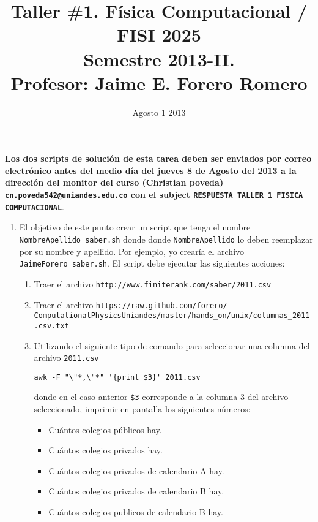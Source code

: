 \documentclass{article}
\title{Taller \#1. F\'isica Computacional / FISI 2025 \\Semestre 2013-II. \\ Profesor: Jaime E. Forero Romero}
\date{Agosto 1 2013}
\begin{document}
\maketitle

{\bf Los dos scripts de soluci\'on de esta tarea deben ser enviados por correo electr\'onico antes del medio d\'ia del jueves 8 de Agosto del 2013 a la direcci\'on del monitor del curso (Christian poveda) {\texttt{cn.poveda542@uniandes.edu.co}} con el subject \verb"RESPUESTA TALLER 1 FISICA COMPUTACIONAL"}.

\begin{enumerate}

\item
El objetivo de este punto crear un script que tenga el nombre \verb"NombreApellido_saber.sh" donde donde \verb"NombreApellido" lo deben reemplazar por su nombre y apellido. Por ejemplo, yo crear\'ia el archivo \verb"JaimeForero_saber.sh". El script debe ejecutar las siguientes acciones:

\begin{enumerate}
\item 
Traer el archivo  \verb"http://www.finiterank.com/saber/2011.csv"
\item
Traer el archivo \verb"https://raw.github.com/forero/"\newline
\verb"ComputationalPhysicsUniandes/master/hands_on/unix/columnas_2011.csv.txt"
\item

  Utilizando el siguiente tipo de comando para seleccionar una columna del archivo \verb"2011.csv"
\begin{verbatim}
awk -F "\"*,\"*" '{print $3}' 2011.csv
\end{verbatim}
donde en el caso anterior \verb"$3" corresponde a la columna 3 del archivo seleccionado, imprimir en pantalla los siguientes n\'umeros:
\begin{itemize}
\item Cu\'antos colegios p\'ublicos hay.
\item Cu\'antos colegios privados hay.
\item Cu\'antos colegios privados de calendario A hay.
\item Cu\'antos colegios privados de calendario B hay.
\item Cu\'antos colegios publicos de calendario B hay.
\end{itemize}



\end{enumerate}
\end{enumerate}
\end{document}

